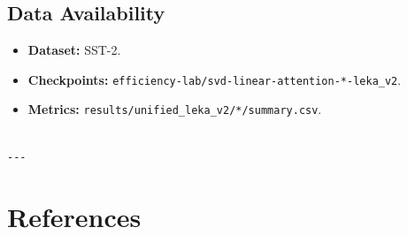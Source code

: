 \subsection{Data Availability}

\begin{itemize}
\item \textbf{Dataset:} SST-2.
\item \textbf{Checkpoints:} \texttt{efficiency-lab/svd-linear-attention-*-leka\_v2}.
\item \textbf{Metrics:} \texttt{results/unified\_leka\_v2/*/summary.csv}.
\end{itemize}
\begin{lstlisting}

---
\end{lstlisting}

\section{References}

